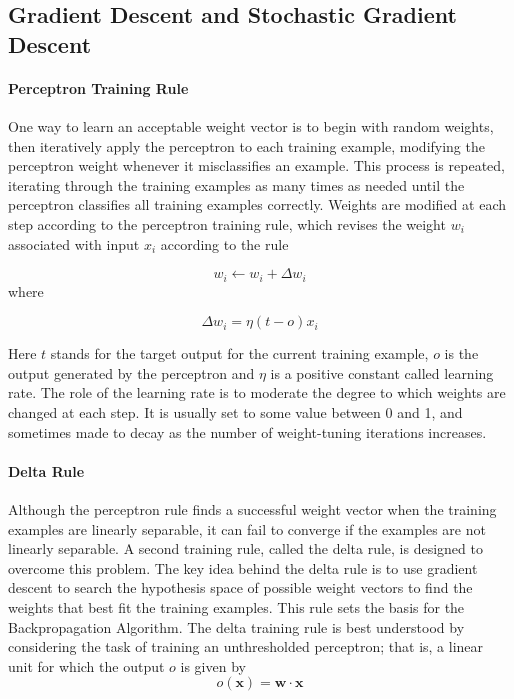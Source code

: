 \documentclass{tufte-handout}
\begin{document}
\subsection{Gradient Descent and Stochastic Gradient Descent}

\paragraph{Perceptron Training Rule}
One way to learn an acceptable weight vector is to begin with random weights, then iteratively apply the perceptron to each training example, modifying the perceptron weight whenever it misclassifies an example. This process is repeated, iterating through the training examples as many times as needed until the perceptron classifies all training examples correctly. Weights are modified at each step according to the perceptron training rule, which revises the weight $w_i$ associated with input $x_i$ according to the rule

\begin{equation}
    w_i \leftarrow w_i + \Delta w_i
\end{equation}
where

\begin{equation}
    \Delta w_i = \eta (t - o)x_i
\end{equation}

Here $t$ stands for the target output for the current training example, $o$ is the output generated by the perceptron and $\eta$ is a positive constant called learning rate. The role of the learning rate is to moderate the degree to which weights are changed at each step. It is usually set to some value between 0 and 1, and sometimes made to decay as the number of weight-tuning iterations increases.

\paragraph{Delta Rule}
Although the perceptron rule finds a successful weight vector when the training examples are linearly separable, it can fail to converge if the examples are not linearly separable. A second training rule, called the delta rule, is designed to overcome this problem.
The key idea behind the delta rule is to use gradient descent to search the hypothesis space of possible weight vectors to find the weights that best fit the training examples. This rule sets the basis for the Backpropagation Algorithm.
The delta training rule is best understood by considering the task of training an unthresholded perceptron; that is, a linear unit for which the output $o$ is given by
\begin{equation}
    o(\mathbf{x}) = \mathbf{w} \cdot \mathbf{x}
\end{equation}
\end{document}
